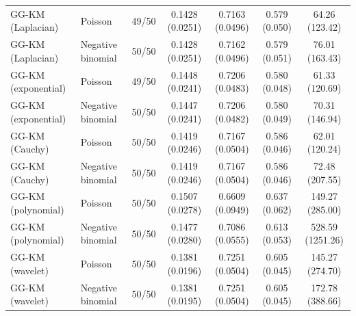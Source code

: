 \begin{table}[tbp]
{\begin{tabular}{llccccc}
GG-KM (Laplacian)
& Poisson
& 49/50
& 0.1428 (0.0251)
& 0.7163 (0.0496)
& 0.579 (0.050)
& 64.26 (123.42) \\

GG-KM (Laplacian)
& Negative binomial
& 50/50
& 0.1428 (0.0251)
& 0.7162 (0.0496)
& 0.579 (0.051)
& 76.01 (163.43) \\

GG-KM (exponential)
& Poisson
& 49/50
& 0.1448 (0.0241)
& 0.7206 (0.0483)
& 0.580 (0.048)
& 61.33 (120.69) \\

GG-KM (exponential)
& Negative binomial
& 50/50
& 0.1447 (0.0241)
& 0.7206 (0.0482)
& 0.580 (0.049)
& 70.31 (146.94) \\

GG-KM (Cauchy)
& Poisson
& 50/50
& 0.1419 (0.0246)
& 0.7167 (0.0504)
& 0.586 (0.046)
& 62.01 (120.24) \\

GG-KM (Cauchy)
& Negative binomial
& 50/50
& 0.1419 (0.0246)
& 0.7167 (0.0504)
& 0.586 (0.046)
& 72.48 (207.55) \\

GG-KM (polynomial)
& Poisson
& 50/50
& 0.1507 (0.0278)
& 0.6609 (0.0949)
& 0.637 (0.062)
& 149.27 (285.00) \\

GG-KM (polynomial)
& Negative binomial
& 50/50
& 0.1477 (0.0280)
& 0.7086 (0.0555)
& 0.613 (0.053)
& 528.59 (1251.26) \\

GG-KM (wavelet)
& Poisson
& 50/50
& 0.1381 (0.0196)
& 0.7251 (0.0504)
& 0.605 (0.045)
& 145.27 (274.70) \\

GG-KM (wavelet)
& Negative binomial
& 50/50
& 0.1381 (0.0195)
& 0.7251 (0.0504)
& 0.605 (0.045)
& 172.78 (388.66) \\

\hline
\end{tabular}
}
\end{table}
